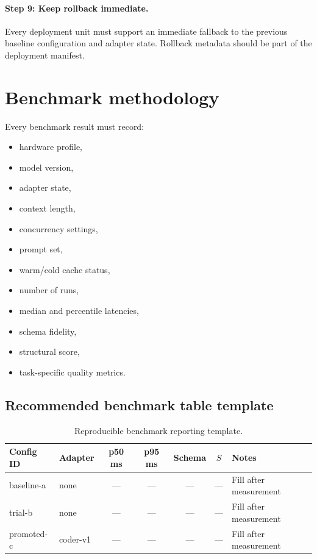     \paragraph{Step 9: Keep rollback immediate.}
    Every deployment unit must support an immediate fallback to the previous baseline configuration and adapter state. Rollback metadata should be part of the deployment manifest.
    
    \section{Benchmark methodology}
    Every benchmark result must record:
    \begin{itemize}
      \item hardware profile,
      \item model version,
      \item adapter state,
      \item context length,
      \item concurrency settings,
      \item prompt set,
      \item warm/cold cache status,
      \item number of runs,
      \item median and percentile latencies,
      \item schema fidelity,
      \item structural score,
      \item task-specific quality metrics.
    \end{itemize}
    
    \subsection{Recommended benchmark table template}
    \begin{table}[H]
    \centering
    \begin{tabularx}{\textwidth}{l l c c c c X}
    \toprule
    Config ID & Adapter & p50 ms & p95 ms & Schema & $S$ & Notes \\
    \midrule
    baseline-a & none & --- & --- & --- & --- & Fill after measurement \\
    trial-b & none & --- & --- & --- & --- & Fill after measurement \\
    promoted-c & coder-v1 & --- & --- & --- & --- & Fill after measurement \\
    \bottomrule
    \end{tabularx}
    \caption{Reproducible benchmark reporting template.}
    \end{table}
    

